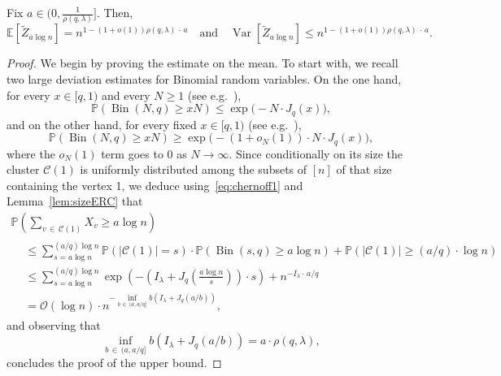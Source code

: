 \documentclass[AHL,Unicode,longabstracts,published]{cedram}
\renewcommand{\Pr}{\mathbb{P}}
\newcommand{\bbE}{\mathbb{E}}
\newcommand{\cO}{\mathcal{O}}
\newcommand{\cC}{\mathcal{C}}
\DeclareMathOperator{\rVar}{Var}
\DeclareMathOperator{\rBin}{Bin}
\begin{document}
\begin{lemm}\label{lem:inter.giant.sub}
Fix $a\in (0,\tfrac{1}{\rho(q,\lambda)}]$. Then,
\[
\bbE\left[\widetilde Z_{a\log n}\right] = n^{1-(1+o(1)) \rho(q,\lambda)\,\cdot\, a } \quad \text{and}\quad \rVar\left[\widetilde Z_{a\log n}\right] \le n^{1-(1+o(1)) \rho(q,\lambda)\,\cdot\, a}.
\]
\end{lemm}
\begin{proof}
We begin by proving the estimate on the mean. To start with, we recall two large deviation estimates for Binomial random variables. On the one hand, for every $x\in [q,1)$ and every $N\ge 1$ (see e.g.~\cite[Corollary~2.20]{Hof16}),
\begin{equation}\label{eq:chernoff1}
\Pr(\rBin(N,q)\ge xN) \le \exp\big(- N \cdot J_q(x)\big),
\end{equation}
and on the other hand, for every fixed $x\in [q,1)$ (see e.g.~\cite[Theorem~2.2.3 and Exercise~2.2.23]{DZ09}),
\begin{equation}\label{eq:chernoff2}
\Pr(\rBin(N,q)\ge xN) \ge \exp\big(-(1+o_N(1))\cdot N \cdot J_q(x)\big),
\end{equation}
where the $o_N(1)$ term goes to $0$ as $N\to \infty$. Since conditionally on its size the cluster $\cC(1)$ is uniformly distributed among the subsets of $[n]$ of that size containing the vertex 1, we deduce using~\eqref{eq:chernoff1} and Lemma~\ref{lem:sizeERC} that
\begin{multline}\label{eq:X_v}
\Pr\left(\sum_{v\,\in\,\cC(1)} X_v\ge a\log n\right)\\
\begin{aligned}
& \le
\sum_{s=a\log n}^{(a/q) \log n} \Pr(|\cC(1)|=s) \cdot \Pr(\rBin(s,q)\ge a\log n)+ \Pr(|\cC(1)|\ge (a/q)\cdot \log n) \\
&\le
\sum_{s=a\log n}^{(a/q)\log n} \exp\left(-\left(I_\lambda +J_q\left(\frac{a\log n}{s}\right)\right) \cdot s\right)+ n^{-I_\lambda \cdot\, a/q} \\
&=
\cO(\log n)\cdot n^{- \inf_{b\,\in\,(a,a/q]} b(I_\lambda + J_q(a/b))},
\end{aligned}
\end{multline}
and observing that
\begin{equation}\label{eq:infb}
\inf_{b\,\in\,(a,a/q]} b\left(I_\lambda + J_q(a/b)\right) = a\cdot \rho(q,\lambda),
\end{equation}
concludes the proof of the upper bound.


\end{proof}
\end{document}
